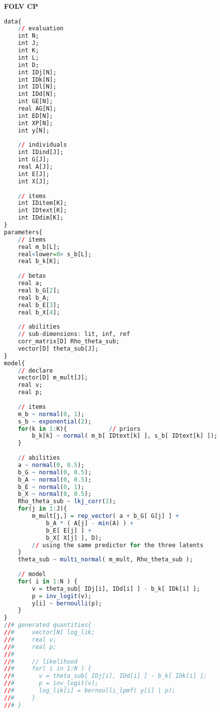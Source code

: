 \noindent \textbf{FOLV CP}
%
\begin{lstlisting}[language=R]
data{
	// evaluation
	int N;
	int J;
	int K;
	int L;
	int D;
	int IDj[N];
	int IDk[N];
	int IDl[N];
	int IDd[N];
	int GE[N];
	real AG[N];
	int ED[N];
	int XP[N];
	int y[N];
	
	// individuals
	int IDind[J];
	int G[J];
	real A[J];
	int E[J];
	int X[J];
	
	// items
	int IDitem[K];
	int IDtext[K];
	int IDdim[K];
}
parameters{
	// items
	real m_b[L];
	real<lower=0> s_b[L];
	real b_k[K];
	
	// betas
	real a;
	real b_G[2];
	real b_A;
	real b_E[3];
	real b_X[4];
	
	// abilities
	// sub-dimensions: lit, inf, ref
	corr_matrix[D] Rho_theta_sub; 
	vector[D] theta_sub[J]; 
}
model{
	// declare
	vector[D] m_mult[J];
	real v;
	real p;
	
	// items
	m_b ~ normal(0, 1);
	s_b ~ exponential(2);
	for(k in 1:K){            // priors
		b_k[k] ~ normal( m_b[ IDtext[k] ], s_b[ IDtext[k] ]); 
	}
	
	// abilities
	a ~ normal(0, 0.5);
	b_G ~ normal(0, 0.5);
	b_A ~ normal(0, 0.5);
	b_E ~ normal(0, 1);
	b_X ~ normal(0, 0.5);
	Rho_theta_sub ~ lkj_corr(2);
	for(j in 1:J){
		m_mult[j,] = rep_vector( a + b_G[ G[j] ] +
			b_A * ( A[j] - min(A) ) +
			b_E[ E[j] ] + 
			b_X[ X[j] ], D);
		// using the same predictor for the three latents
	}
	theta_sub ~ multi_normal( m_mult, Rho_theta_sub );
	
	// model
	for( i in 1:N ) {
		v = theta_sub[ IDj[i], IDd[i] ] - b_k[ IDk[i] ];
		p = inv_logit(v);
		y[i] ~ bernoulli(p);
	}
}
//# generated quantities{
//#     vector[N] log_lik;
//#     real v;
//#     real p;
//#     
//#     // likelihood
//#     for( i in 1:N ) {
//#       v = theta_sub[ IDj[i], IDd[i] ] - b_k[ IDk[i] ];
//#       p = inv_logit(v);
//#       log_lik[i] = bernoulli_lpmf( y[i] | p);
//#     }
//# }
\end{lstlisting} 


